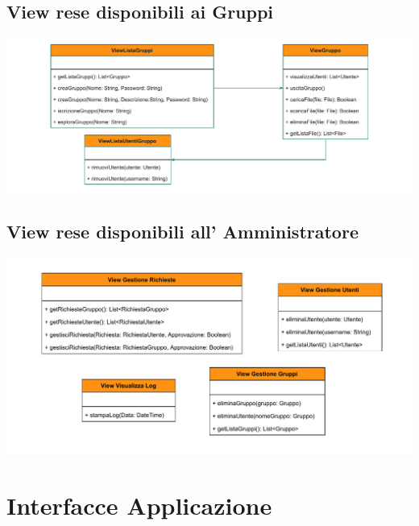 \subsection*{View rese disponibili ai Gruppi}
{}
\begin{adjustwidth}{-3cm}{0cm}
\includegraphics[scale=0.9]{progettazione/Progettazione-Interfacce Disponibili ai Gruppi.drawio.pdf}
\end{adjustwidth}
\vspace{0.5cm}


\subsection*{View rese disponibili all' Amministratore}
{}
\begin{adjustwidth}{-2.5cm}{0cm}
\includegraphics[scale=0.9]{progettazione/Progettazione-Interfacce Disponibili all' Amministratore.drawio.pdf}
\end{adjustwidth}
\vspace{0.5cm}




\section*{Interfacce Applicazione}
{}
\vspace{0.5cm}

